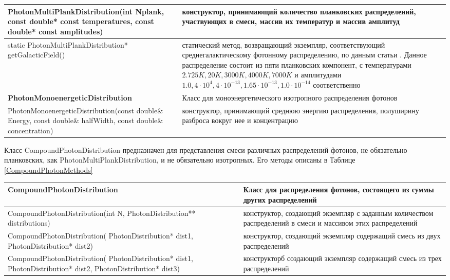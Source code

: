 \begin{small}
\begin{xtabular}{|p{0.45\textwidth}|p{0.55\textwidth}|}
				\hline
				PhotonMultiPlankDistribution(int Nplank, const double* const temperatures, const double* const amplitudes) & конструктор, принимающий количество планковских распределений, участвующих в смеси, массив их температур и массив амплитуд\\
				\hline
				static PhotonMultiPlankDistribution* getGalacticField() & статический метод, возвращающий экземпляр, соответствующий среднегалактическому фотонному распределению, по данным статьи \cite{Mathis1983}. Данное распределение состоит из пяти планковских компонент, с температурами $2.725K, 20K, 3000K, 4000K, 7000K$ и амплитудами $1.0, 4\cdot10^{4}, 4\cdot10^{-13}, 1.65\cdot10^{-13}, 1.0\cdot10^{-14}$ соответственно\\
				\hline
				\textbf{PhotonMonoenergeticDistribution} & Класс для моноэнергетического изотропного распределения фотонов\\
				\hline
				PhotonMonoenergeticDistribution(const double\& Energy, const double\& halfWidth, const double\& concentration) & конструктор, принимающий среднюю энергию распределения, полуширину разброса вокруг нее и концентрацию\\
				\hline
	\end{xtabular}
\end{small}

Класс CompoundPhotonDistribution предназначен для представления смеси различных распределений фотонов, не обязательно планковских, как PhotonMultiPlankDistribution, и не обязательно изотропных. Его методы описаны в Таблице \ref{CompoundPhotonMethods}

\begin{small}
		\label{CompoundPhotonMethods}
			\begin{xtabular}{|p{0.45\textwidth}|p{0.55\textwidth}|}
				\hline
				\textbf{CompoundPhotonDistribution} & Класс для распределения фотонов, состоящего из суммы других распределений\\
				\hline
				CompoundPhotonDistribution(int N, PhotonDistribution** distributions) & конструктор, создающий экземпляр с заданным количеством распределений в смеси и массивом этих распределений \\
				\hline
				CompoundPhotonDistribution( PhotonDistribution* dist1, PhotonDistribution* dist2) & конструктор, создающий экземпляр содержащий смесь из двух распределений\\
				\hline
				CompoundPhotonDistribution( PhotonDistribution* dist1, PhotonDistribution* dist2, PhotonDistribution* dist3) & конструкторб создающий экземпляр содержащий смесь из трех распределений\\
				\hline
	\end{xtabular}
\end{small}

